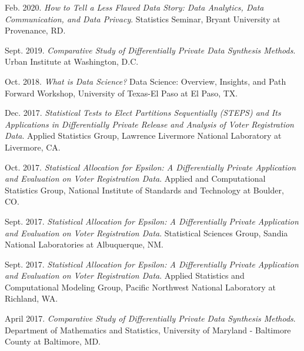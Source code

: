 \documentclass[11pt, letterpaper, roman]{moderncv} %
\begin{document}
\begin{etaremune}[topsep=0pt, itemsep=6pt, partopsep=0pt, parsep=0pt]
    \item Feb. 2020. \textit{How to Tell a Less Flawed Data Story: Data Analytics, Data Communication, and Data Privacy}. Statistics Seminar, Bryant University at Provenance, RD.
    
    \item Sept. 2019. \textit{Comparative Study of Differentially Private Data Synthesis Methods}. Urban Institute at Washington, D.C.
    
    \item Oct. 2018. \textit{What is Data Science?} Data Science: Overview, Insights, and Path Forward Workshop, University of Texas-El Paso at El Paso, TX.
    
    \item Dec. 2017. \textit{Statistical Tests to Elect Partitions Sequentially (STEPS) and Its Applications in Differentially Private Release and Analysis of Voter Registration Data}. Applied Statistics Group, Lawrence Livermore National Laboratory at Livermore, CA.
    
    \item Oct. 2017. \textit{Statistical Allocation for Epsilon: A Differentially Private Application and Evaluation on Voter Registration Data}. Applied and Computational Statistics Group, National Institute of Standards and Technology at Boulder, CO.
    
    \item Sept. 2017. \textit{Statistical Allocation for Epsilon: A Differentially Private Application and Evaluation on Voter Registration Data}. Statistical Sciences Group, Sandia National Laboratories at Albuquerque, NM.
    
    \item Sept. 2017. \textit{Statistical Allocation for Epsilon: A Differentially Private Application and Evaluation on Voter Registration Data}. Applied Statistics and Computational Modeling Group, Pacific Northwest National Laboratory at Richland, WA.
    
    \item April 2017. \textit{Comparative Study of Differentially Private Data Synthesis Methods}. Department of Mathematics and Statistics, University of Maryland - Baltimore County at Baltimore, MD.
\end{etaremune}

\end{document}
